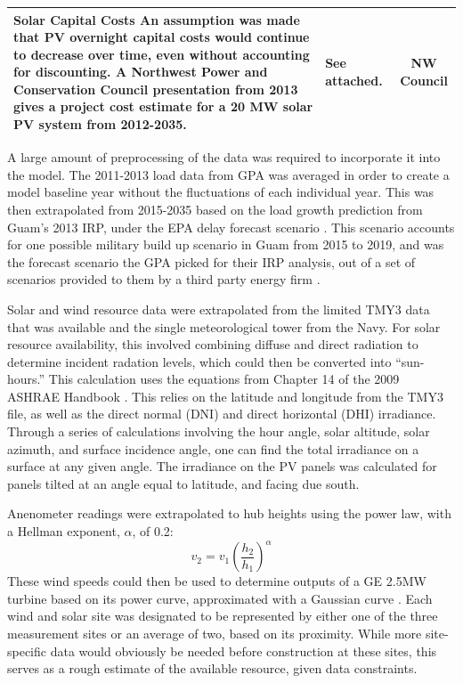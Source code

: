 \documentclass[12pt,letterpaper,fleqn]{article}
\begin{document}
\begin{center}
\begin{longtable}{| p{11cm} | p{3cm} | c | }
    \textbf{Solar Capital Costs} An assumption was made that PV
    overnight capital costs would continue to decrease over time,
    even without accounting for discounting. A Northwest Power and
    Conservation Council presentation from 2013 gives a project cost
    estimate for a 20 MW solar PV system from 2012-2035.  
    & See attached. 
    & NW Council \cite{simmons13} 
    \\\hline

  \end{longtable}
\end{center}

A large amount of preprocessing of the data was required to
incorporate it into the model. The 2011-2013 load data from GPA was
averaged in order to create a model baseline year without the
fluctuations of each individual year. This was then extrapolated from
2015-2035 based on the load growth prediction from Guam's 2013 IRP,
under the EPA delay forecast scenario \cite{cruz13}. This scenario
accounts for one possible military build up scenario in Guam from 2015
to 2019, and was the forecast scenario the GPA picked for their IRP
analysis, out of a set of scenarios provided to them by a third party
energy firm \cite{cruz13}.

Solar and wind resource data were extrapolated from the limited
TMY3 data that was available and the single meteorological tower from the
Navy. For solar resource availability, this involved combining diffuse and direct radiation to
determine incident radation levels, which could then be converted into
``sun-hours.'' This calculation uses the equations from Chapter 14 of
the 2009 ASHRAE Handbook \cite{ashrae}. This relies on the latitude
and longitude from the TMY3 file, as well as the direct normal (DNI)
and direct horizontal (DHI) irradiance. Through a series of
calculations involving the hour angle, solar altitude, solar azimuth,
and surface incidence angle, one can find the total irradiance on a
surface at any given angle. The irradiance on the PV panels was
calculated for panels tilted at an angle equal to latitude, and facing
due south.

Anenometer readings were extrapolated to hub heights
using the power law, with a Hellman exponent, $\alpha$, of 0.2:
\[v_2 = v_1\left(\frac{h_2}{h_1}\right)^\alpha\] 
These wind speeds could then be used to determine outputs of a GE
2.5MW turbine based on its power curve, approximated with a Gaussian
curve \cite{ge}. Each wind and solar site was designated to be
represented by either one of the three measurement sites or an average
of two, based on its proximity. While more site-specific data would
obviously be needed before construction at these sites, this serves as
a rough estimate of the available resource, given data constraints.
\end{document}
